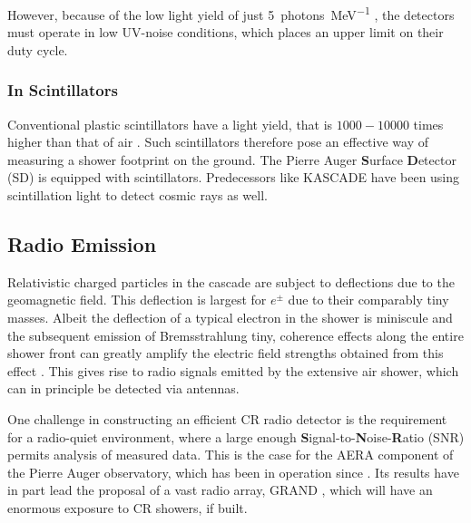 However, because of the low light yield of just \SI{5}{photons\per\MeV} \cite{nagano2004new}, the detectors must operate in low UV-noise conditions, which 
places an upper limit on their duty cycle.

\subsubsection{In Scintillators}

Conventional plastic scintillators have a light yield, that is $1000-10000$ times higher than that of air \cite{holl1988measurement}. Such scintillators therefore 
pose an effective way of measuring a shower footprint on the ground. The Pierre Auger \textbf{S}urface \textbf{D}etector (SD) is equipped with scintillators. 
Predecessors like KASCADE \cite{Kascade} have been using scintillation light to detect cosmic rays as well.

\subsection{Radio Emission}
\label{ssec:radio-emission}

Relativistic charged particles in the cascade are subject to deflections due to the geomagnetic field. This deflection is largest for $e^\pm$ due to their 
comparably tiny masses. Albeit the deflection of a typical electron in the shower is miniscule and the subsequent emission of Bremsstrahlung tiny, coherence 
effects along the entire shower front can greatly amplify the electric field strengths obtained from this effect \cite{schroeder2017radio}. This gives rise to radio
signals emitted by the extensive air shower, which can in principle be detected via antennas.

One challenge in constructing an efficient CR radio detector is the requirement for a radio-quiet environment, where a large enough 
\textbf{S}ignal-to-\textbf{N}oise-\textbf{R}atio (SNR) permits analysis of measured data. This is the case for the AERA component of the Pierre Auger observatory,
which has been in operation since . Its results have in part lead the proposal of a vast radio array, GRAND , which will have an enormous 
exposure to CR showers, if built.